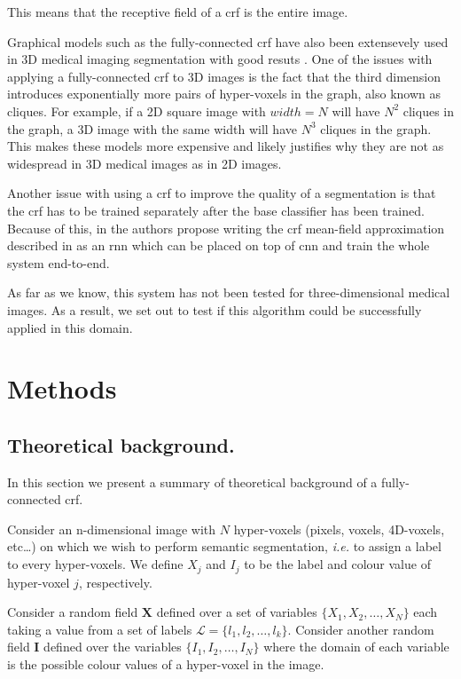 \documentclass{article}
\begin{document}
This means that the receptive field of a \gls{crf} is the entire image.


Graphical models such as the fully-connected \gls{crf} have also been extensevely used in 3D medical imaging segmentation with good resuts \cite{medseg_example_1, medseg_example_2, medseg_example_3, medseg_example_4, medseg_example_5}.
One of the issues with applying a fully-connected \gls{crf} to 3D images is the fact that the third dimension introduces exponentially more pairs of hyper-voxels in the graph, also known as cliques. For example, if a 2D square image with $width=N$ will have $N^2$ cliques in the graph, a 3D image with the same width will have $N^3$ cliques in the graph.
This makes these models more expensive and likely justifies why they are not as widespread in 3D medical images as in 2D images.


Another issue with using a \gls{crf} to improve the quality of a segmentation is that the \gls{crf} has to be trained separately after the base classifier has been trained. 
Because of this, in \cite{CRFasRNN} the authors propose writing the \gls{crf} mean-field approximation described in \cite{FullyConnectedCRF} as an \gls{rnn} which can be placed on top of \gls{cnn} and train the whole system end-to-end.

As far as we know, this system has not been tested for three-dimensional medical images.
As a result, we set out to test if this algorithm could be successfully applied in this domain.

\section{Methods}

\subsection{Theoretical background.}
In this section we present a summary of theoretical background of a fully-connected \gls{crf}\cite{FullyConnectedCRF}.

Consider an n-dimensional image with $N$ hyper-voxels (pixels, voxels, 4D-voxels, etc\dots) on which we wish to perform semantic segmentation, \textit{i.e.} to assign a label to every hyper-voxels.
We define $X_j$ and $I_j$ to be the label and colour value of hyper-voxel $j$, respectively.

Consider a random field $\textbf{X}$ defined over a set of variables $\{X_1, X_2, \dots, X_N\}$ each taking a value from a set of labels $\mathcal{L} = \{ l_1, l_2, \dots, l_k\}$.
Consider another random field $\textbf{I}$ defined over the variables $\{I_1, I_2, \dots, I_N\}$ where the domain of each variable is the possible colour values of a hyper-voxel in the image.
\end{document}
